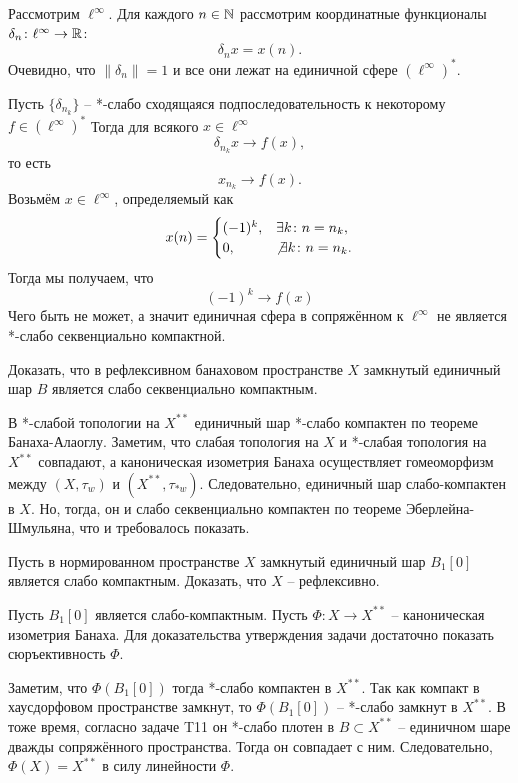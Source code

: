 \begin{solution}
    Рассмотрим $\ell^\infty$.
    Для каждого $n \in \mathbb{N}$ рассмотрим координатные функционалы $\delta_n\colon \ell^\infty \to \mathbb{R}\colon$
    \[
        \delta_n x = x(n).
    \]
    Очевидно, что $\|\delta_n\| = 1$ и все они лежат на единичной сфере $(\ell^\infty)^*$.

    Пусть $\{\delta_{n_k}\}$ -- *-слабо сходящаяся подпоследовательность к некоторому $f \in (\ell^\infty)^*$
    Тогда для всякого $x \in \ell^{\infty}$
    \[
        \delta_{n_k} x \rightarrow f(x),
    \]
    то есть
    \[
        x_{n_k} \rightarrow f(x).
    \]
    Возьмём $x \in \ell^{\infty}$, определяемый как
    \[
        x(n) = \begin{cases}
        (-1)^{k}, & \exists k\colon n = n_k, \\
                   0, & \not\exists k \colon n = n_k.
        \end{cases}
    \]
    Тогда мы получаем, что
    \[
        (-1)^{k} \rightarrow f(x)
    \]
    Чего быть не может, а значит единичная сфера в сопряжённом к $\ell^\infty$ не является *-слабо секвенциально компактной.
\end{solution}
\begin{task}[T9]
    Доказать, что в рефлексивном банаховом пространстве $X$ замкнутый единичный шар $B$ является слабо секвенциально компактным.
\end{task}
\begin{solution}
    В *-слабой топологии на $X^{**}$ единичный шар *-слабо компактен по теореме Банаха-Алаоглу.
    Заметим, что слабая топология на $X$ и *-слабая топология на $X^{**}$ совпадают, а каноническая изометрия Банаха осуществляет гомеоморфизм между $(X, \tau_w)$ и $(X^{**}, \tau_{*w})$.
    Следовательно, единичный шар слабо-компактен в $X$.
    Но, тогда, он и слабо секвенциально компактен по теореме Эберлейна-Шмульяна, что и требовалось показать.
\end{solution}
\begin{task}[T10]
    Пусть в нормированном пространстве $X$ замкнутый единичный шар $B_1[0]$ является слабо компактным.
    Доказать, что $X$ -- рефлексивно.
\end{task}
\begin{solution}
    Пусть $B_1[0]$ является слабо-компактным.
    Пусть $\Phi\colon X \to X^{**}$ -- каноническая изометрия Банаха.
    Для доказательства утверждения задачи достаточно показать сюръективность $\Phi$.

    Заметим, что $\Phi(B_1[0])$ тогда *-слабо компактен в $X^{**}$.
    Так как компакт в хаусдорфовом пространстве замкнут, то $\Phi(B_1[0])$ -- *-слабо замкнут в $X^{**}$.
    В тоже время, согласно задаче T11 он *-слабо плотен в $B \subset X^{**}$ -- единичном шаре дважды сопряжённого пространства.
    Тогда он совпадает с ним.
    Следовательно, $\Phi(X) = X^{**}$ в силу линейности $\Phi$.
\end{solution}
